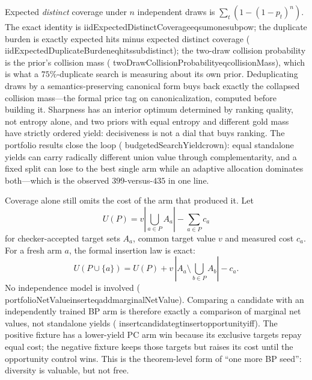 \documentclass[11pt]{article}
\newcommand{\leanname}[1]{{\scriptsize\ttfamily
  \def\_{\textunderscore\allowbreak}#1}}
\begin{document}
Expected \emph{distinct} coverage under $n$ independent draws is
$\sum_t (1-(1-p_t)^n)$.
The exact identity is
\leanname{iidExpectedDistinctCoverage\_eq\_sum\_one\_sub\_pow}; the duplicate burden is
exactly expected hits minus expected distinct coverage
(\leanname{iidExpectedDuplicateBurden\_eq\_hits\_sub\_distinct}); the two-draw collision
probability is the prior's collision mass
(\leanname{twoDrawCollisionProbability\_eq\_collisionMass}), which is what a
$75\%$-duplicate search is measuring about its own prior. Deduplicating draws by a
semantics-preserving canonical form buys back exactly the collapsed collision mass---the
formal price tag on canonicalization, computed before building it. Sharpness has an
interior optimum determined by ranking quality, not entropy alone, and two priors with
equal entropy and different gold mass have strictly ordered yield: decisiveness is not a
dial that buys ranking. The portfolio results close the loop
(\leanname{budgetedSearchYield\_crown}): equal standalone yields can carry radically
different union value through complementarity, and a fixed split can lose to the best
single arm while an adaptive allocation dominates both---which is the observed
$399$-versus-$435$ in one line.

Coverage alone still omits the cost of the arm that produced it. Let
\[
  U(P)=v\left|\bigcup_{a\in P}A_a\right|-\sum_{a\in P}c_a
\]
for checker-accepted target sets $A_a$, common target value $v$ and measured cost
$c_a$. For a fresh arm $a$, the formal insertion law is exact:
\[
  U(P\cup\{a\})=U(P)+v\,|A_a\setminus{\textstyle\bigcup_{b\in P}}A_b|-c_a.
\]
No independence model is involved
(\leanname{portfolioNetValue\_insert\_eq\_add\_marginalNetValue}).
Comparing a candidate with an independently trained BP arm is therefore exactly a
comparison of marginal net values, not standalone yields
(\leanname{insert\_candidate\_gt\_insert\_opportunity\_iff}).
The positive fixture has a lower-yield PC arm win because its exclusive targets repay
equal cost; the negative fixture keeps those targets but raises its cost until the
opportunity control wins. This is the theorem-level form of ``one more BP seed'':
diversity is valuable, but not free.
\end{document}
